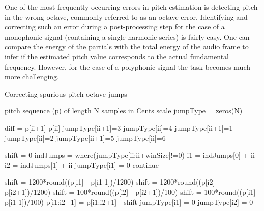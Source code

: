 {One of the most frequently occurring errors in pitch estimation is detecting pitch in the wrong octave, commonly referred to as an octave error. Identifying and correcting such an error during a post-processing step for the case of a monophonic signal (containing a single harmonic series) is fairly easy. One can compare the energy of the partials with the total energy of the audio frame to infer if the estimated pitch value corresponds to the actual fundamental frequency. However, for the case of a polyphonic signal the task becomes much more challenging. 

\renewcommand{\algorithmiccomment}[1]{\bgroup\hfill\tiny//~#1\egroup}

\begin{algorithm}
	\caption{Correcting spurious pitch octave jumps}
	\label{alg:algorithmPitchCorrection}
	\begin{algorithmic}  
		 pitch sequence (p) of length N samples in Cents scale
		\State jumpType = zeros(N)	
		
									
		\State diff = p[ii+1]-p[ii]
		\State jumpType[ii+1]=3			
		\State jumpType[ii]=4			
		\EndIf
		\State jumpType[ii+1]=1			
		\State jumpType[ii]=2			
		\State jumpType[ii+1]=5			
		\Else
		\State jumpType[ii]=6			
		\EndIf
		\EndIf
		\EndFor
		
						
		\State shift = 0
		\State indJumps = where(jumpType[ii:ii+winSize]!=0)			
						
		\State i1 = indJumps[0] + ii
		\State i2 = indJumps[1]	+ ii			
		\State jumpType[i1] = 0
		\State continue			
		\EndIf
		
		\State shift = 1200*round((p[i1] - p[i1-1])/1200)
		\State shift = 1200*round((p[i2] - p[i2+1])/1200)
		\State shift = 100*round((p[i2] - p[i2+1])/100)
		\State shift = 100*round((p[i1] - p[i1-1])/100)
		\EndIf
		\EndIf
		\EndIf
		\State p[i1:i2+1] = p[i1:i2+1] - shift
		\State jumpType[i1] = 0
		\State jumpType[i2] = 0		
		

\end{algorithmic}
\end{algorithm}}
